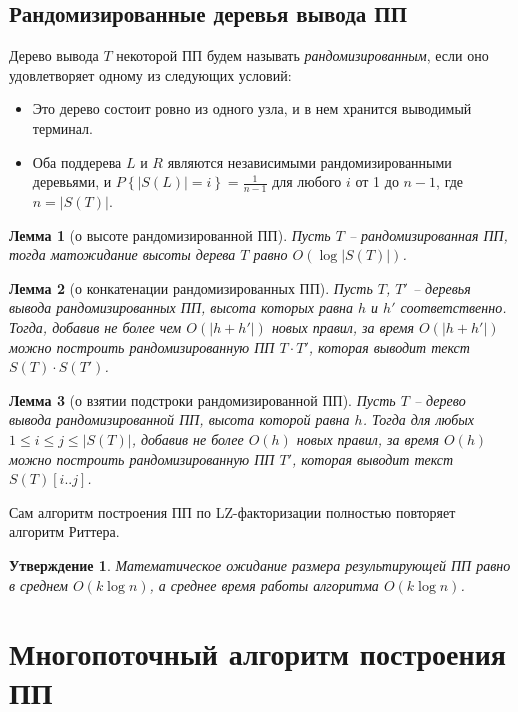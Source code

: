 \documentclass[14pt]{article}
\newtheorem{lemma}{Лемма}[section]
\newtheorem{claim}{Утверждение}[section]
\begin{document}
\subsection{Рандомизированные деревья вывода ПП}

Дерево вывода $T$ некоторой ПП будем называть {\it рандомизированным}, если
оно удовлетворяет одному из следующих условий:
\begin{itemize}
	\item Это дерево состоит ровно из одного узла, и в нем хранится выводимый терминал.
	\item Оба поддерева $L$ и $R$ являются независимыми рандомизированными деревьями, и 
	$P\left\{\left|S(L)\right| = i\right\} = \frac{1}{n-1}$ для любого $i$ от 1 до $n-1$, где $n = |S(T)|$.
\end{itemize}

\begin{lemma}[о высоте рандомизированной ПП]
	Пусть $T$ -- рандомизированная ПП, тогда матожидание высоты дерева $T$ равно $O(\log |S(T)|)$.
\end{lemma}

\begin{lemma}[о конкатенации рандомизированных ПП]
Пусть $T$, $T'$ -- деревья вывода рандомизированных ПП, высота которых равна $h$ и $h'$ соответственно. Тогда, добавив не более
чем $O\left(|h + h'|\right)$ новых правил, за время $O\left(|h + h'|\right)$ можно построить рандомизированную ПП $T \cdot T'$,
которая выводит текст $S(T)\cdot S(T')$.
\end{lemma}

\begin{lemma}[о взятии подстроки рандомизированной ПП]
Пусть $T$ -- дерево вывода рандомизированной ПП, высота которой равна $h$. Тогда для любых $1 \leq i \leq j \leq |S(T)|$,
добавив не более $O(h)$ новых правил, за время $O(h)$ можно построить рандомизированную ПП $T'$, которая выводит текст $S(T)[i..j]$.
\end{lemma}

Сам алгоритм построения ПП по LZ-факторизации полностью повторяет алгоритм Риттера.

\begin{claim}
	Математическое ожидание размера результирующей ПП равно в среднем $O(k\log n)$, а среднее время работы алгоритма $O(k\log n)$.
\end{claim}

\section{Многопоточный алгоритм построения ПП}
\label{ConcurrentAvlSLP}
\end{document}
